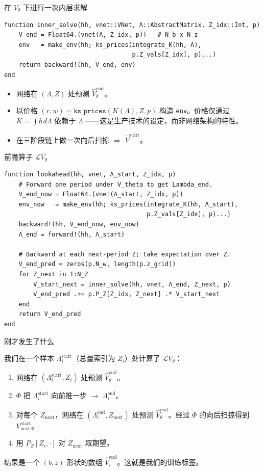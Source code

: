 \documentclass[10pt,aspectratio=169]{beamer}
\newcommand{\Vstart}{V^{\mathrm{start}}}
\newcommand{\Vend}{V^{\mathrm{end}}}
\newcommand{\Vstarttil}{\widetilde{V}^{\mathrm{start}}}
\newcommand{\Vendhat}{\widehat{V}^{\mathrm{end}}}
\newcommand{\Lstart}{\Lambda^{\mathrm{start}}}
\newcommand{\Lop}{\mathcal{L}}
\begin{document}
\begin{frame}[fragile]{在 $V_\theta$ 下进行一次内层求解}
\begin{lstlisting}
function inner_solve(hh, vnet::VNet, Λ::AbstractMatrix, Z_idx::Int, p)
    V_end = Float64.(vnet(Λ, Z_idx, p))   # N_b x N_z
    env   = make_env(hh; ks_prices(integrate_K(hh, Λ),
                                   p.Z_vals[Z_idx], p)...)
    return backward!(hh, V_end, env)
end
\end{lstlisting}

\vspace{0.4em}

\begin{itemize}
  \item 网络在 $(\Lambda, Z)$ 处预测 $\Vendhat_\theta$。
  \item 以价格 $(r, w) = \texttt{ks\_prices}(K(\Lambda), Z, p)$ 构造 \texttt{env}。价格仅通过 $K = \int b\, d\Lambda$ 依赖于 $\Lambda$ ——这是生产技术的设定，而非网络架构的特性。
  \item 在三阶段链上做一次向后扫掠 $\Rightarrow$ $\Vstarttil$。
\end{itemize}

\end{frame}

\begin{frame}[fragile]{前瞻算子 $\Lop V_\theta$}
\begin{lstlisting}
function lookahead(hh, vnet, Λ_start, Z_idx, p)
    # Forward one period under V_theta to get Lambda_end.
    V_end_now = Float64.(vnet(Λ_start, Z_idx, p))
    env_now   = make_env(hh; ks_prices(integrate_K(hh, Λ_start),
                                       p.Z_vals[Z_idx], p)...)
    backward!(hh, V_end_now, env_now)
    Λ_end = forward!(hh, Λ_start)

    # Backward at each next-period Z; take expectation over Z.
    V_end_pred = zeros(p.N_w, length(p.z_grid))
    for Z_next in 1:N_Z
        V_start_next = inner_solve(hh, vnet, Λ_end, Z_next, p)
        V_end_pred .+= p.P_Z[Z_idx, Z_next] .* V_start_next
    end
    return V_end_pred
end
\end{lstlisting}
\end{frame}

\begin{frame}{刚才发生了什么}

我们在一个样本 $\Lstart_i$（总量索引为 $Z_i$）处计算了 $\Lop V_\theta$：
\begin{enumerate}
  \item 网络在 $(\Lstart_i, Z_i)$ 处预测 $\Vendhat_\theta$。
  \item $\Phi$ 把 $\Lstart_i$ 向前推一步 $\to$ $\Lambda^\text{end}_i$。
  \item 对每个 $Z_\text{next}$，网络在 $(\Lambda^\text{end}_i, Z_\text{next})$ 处预测 $\Vendhat_\theta$。经过 $\Phi$ 的向后扫掠得到 $\Vstart_\text{next}$。
  \item 用 $P_Z[Z_i, \cdot]$ 对 $Z_\text{next}$ 取期望。
\end{enumerate}

\smallskip

结果是一个 $(b, z)$ 形状的数组 $\widehat\Vend_i$。这就是我们的训练标签。

\end{frame}
\end{document}
